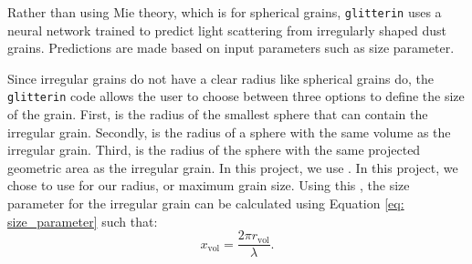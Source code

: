 
Rather than using Mie theory, which is for spherical grains, \texttt{glitterin} uses a neural network trained to predict light scattering from irregularly shaped dust grains. Predictions are made based on input parameters such as size parameter. 



Since irregular grains do not have a clear radius like spherical grains do, the \texttt{glitterin} code allows the user to choose between three options to define the size of the grain. First, \renc is the radius of the smallest sphere that can contain the irregular grain. Secondly, \rvol is the radius of a sphere with the same volume as the irregular grain. Third, \rpja is the radius of the sphere with the same projected geometric area as the irregular grain. In this project, we use \rvol. In this project, we chose to use \rvol for our radius, or maximum grain size. Using this \rvolNS, the size parameter for the irregular grain can be calculated using Equation \ref{eq: size_parameter} such that:
\begin{equation}
    x_\text{vol} = \frac{2 \pi r_\text{vol}}{\lambda}.
\end{equation}
\noindent 



















